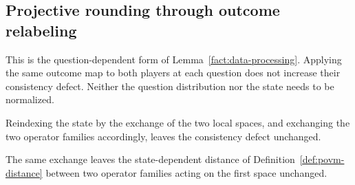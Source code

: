 	\subsection{Projective rounding through outcome relabeling}


	\begin{lemma}
		\label{lem:qld-consistency-defect-postprocess-question}
		\leanok
		This is the question-dependent form of Lemma~\ref{fact:data-processing}.
		Applying the same outcome map to both players at each question does not
		increase their consistency defect. Neither the question distribution nor
		the state needs to be normalized.
	\end{lemma}

	\begin{lemma}
		\label{lem:qld-consistency-defect-prodcomm}
		\leanok
		Reindexing the state by the exchange of the two local spaces, and
		exchanging the two operator families accordingly, leaves the consistency
		defect unchanged.
	\end{lemma}

	\begin{lemma}
		\label{lem:qld-opfamilydistsq-prodcomm}
		\leanok
		The same exchange leaves the state-dependent distance of
		Definition~\ref{def:povm-distance} between two operator families acting on
		the first space unchanged.
	\end{lemma}

